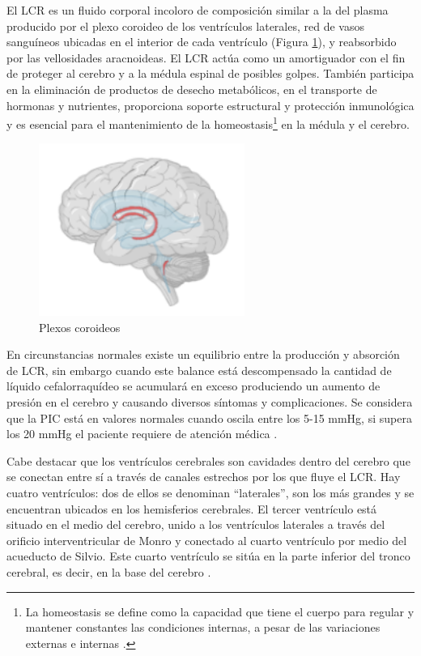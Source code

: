 El LCR es un fluido corporal incoloro de composición similar a la del plasma producido por el plexo coroideo de los ventrículos laterales, red de vasos sanguíneos ubicadas en el interior de cada ventrículo (Figura \ref{fig:plexos_coroideos}), y reabsorbido por las vellosidades aracnoideas. El LCR actúa como un amortiguador con el fin de proteger al cerebro y a la médula espinal de posibles golpes. También participa en la eliminación de productos de desecho metabólicos, en el transporte de hormonas y nutrientes, proporciona soporte estructural y protección inmunológica y es esencial para el mantenimiento de la homeostasis\footnote{La homeostasis se define como la capacidad que tiene el cuerpo para regular y mantener constantes las condiciones internas, a pesar de las variaciones externas e internas \cite{homeostasis}.} en la médula y el cerebro.
\begin{figure}[h]
    \centering
    \includegraphics[width=0.6\textwidth]{img/plexos_coroideos.PNG}
    \caption{Plexos coroideos}
    \label{fig:plexos_coroideos}
\end{figure}

En circunstancias normales existe un equilibrio entre la producción y absorción de LCR, sin embargo cuando este balance está descompensado la cantidad de líquido cefalorraquídeo se acumulará en exceso produciendo un aumento de presión en el cerebro y causando diversos síntomas y complicaciones. Se considera que la PIC está en valores normales cuando oscila entre los 5-15 mmHg, si supera los 20 mmHg el paciente requiere de atención médica \cite{mmhg}.

Cabe destacar que los ventrículos cerebrales son cavidades dentro del cerebro que se conectan entre sí a través de canales estrechos por los que fluye el LCR. Hay cuatro ventrículos: dos de ellos se denominan “laterales”, son los más grandes y se encuentran ubicados en los hemisferios cerebrales. El tercer ventrículo está situado en el medio del cerebro, unido a los ventrículos laterales a través del orificio interventricular de Monro y conectado al cuarto ventrículo por medio del acueducto de Silvio. Este cuarto ventrículo se sitúa en la parte inferior del tronco cerebral, es decir, en la base del cerebro \cite{ventric}. 

